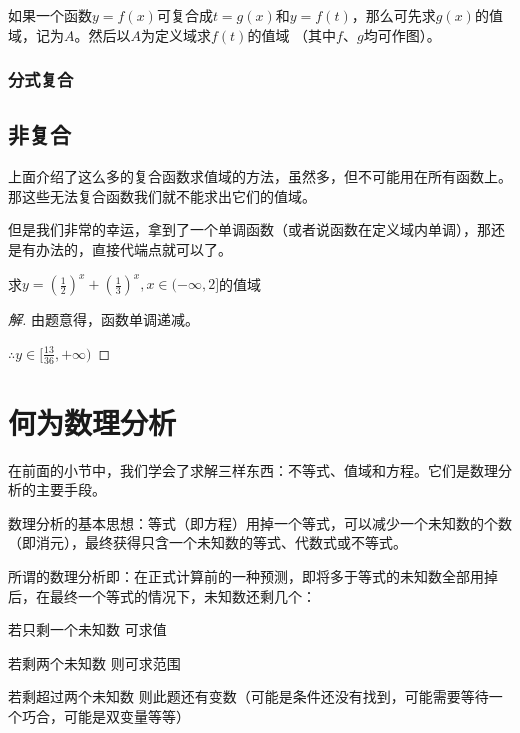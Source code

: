 如果一个函数$y=f(x)$可复合成$t=g(x)$和$y=f(t)$，那么可先求$g(x)$的值域，记为$A$。然后以$A$为定义域求$f(t)$的值域
（其中$f$、$g$均可作图）。

\subsubsection{分式复合}


\subsection{非复合}
上面介绍了这么多的复合函数求值域的方法，虽然多，但不可能用在所有函数上。那这些无法复合函数我们就不能求出它们的值域。

但是我们非常的幸运，拿到了一个单调函数（或者说函数在定义域内单调），那还是有办法的，直接代端点就可以了。

\begin{example}
	求$y=(\frac{1}{2})^x+(\frac{1}{3})^x,x\in(-\infty,2]$的值域
\end{example}
\begin{proof}[解]
	由题意得，函数单调递减。

	$\therefore y\in[\frac{13}{36},+\infty)$
\end{proof}

\section{何为数理分析}
在前面的小节中，我们学会了求解三样东西：不等式、值域和方程。它们是数理分析的主要手段。

数理分析的基本思想：等式（即方程）用掉一个等式，可以减少一个未知数的个数（即消元），最终获得只含一个未知数的等式、代数式或不等式。

所谓的数理分析即：在正式计算前的一种预测，即将多于等式的未知数全部用掉后，在最终一个等式的情况下，未知数还剩几个：

\begin{desclist}
	\item[若只剩一个未知数] 可求值
	\item[若剩两个未知数] 则可求范围
	\item[若剩超过两个未知数] 则此题还有变数（可能是条件还没有找到，可能需要等待一个巧合，可能是双变量等等）
\end{desclist}
